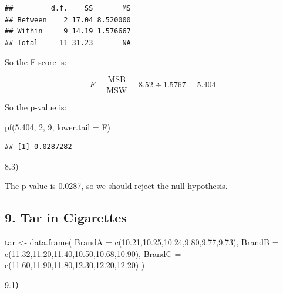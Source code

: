 \documentclass[
]{article}
\newenvironment{Shaded}{\begin{snugshade}}{\end{snugshade}}
\newcommand{\AttributeTok}[1]{\textcolor[rgb]{0.77,0.63,0.00}{#1}}
\newcommand{\DecValTok}[1]{\textcolor[rgb]{0.00,0.00,0.81}{#1}}
\newcommand{\FloatTok}[1]{\textcolor[rgb]{0.00,0.00,0.81}{#1}}
\newcommand{\FunctionTok}[1]{\textcolor[rgb]{0.00,0.00,0.00}{#1}}
\newcommand{\NormalTok}[1]{#1}
\newcommand{\OtherTok}[1]{\textcolor[rgb]{0.56,0.35,0.01}{#1}}
\begin{document}
\begin{verbatim}
##         d.f.    SS       MS
## Between    2 17.04 8.520000
## Within     9 14.19 1.576667
## Total     11 31.23       NA
\end{verbatim}

So the F-score is:

\[
F = \frac{\text{MSB}}{\text{MSW}} = 8.52 \div 1.5767 = 5.404
\]

So the p-value is:

\begin{Shaded}
\begin{Highlighting}[]
\FunctionTok{pf}\NormalTok{(}\FloatTok{5.404}\NormalTok{, }\DecValTok{2}\NormalTok{, }\DecValTok{9}\NormalTok{, }\AttributeTok{lower.tail =}\NormalTok{ F)}
\end{Highlighting}
\end{Shaded}

\begin{verbatim}
## [1] 0.0287282
\end{verbatim}

8.3)

The p-value is 0.0287, so we should reject the null hypothesis.

\hypertarget{tar-in-cigarettes}{%
\subsection{9. Tar in Cigarettes}\label{tar-in-cigarettes}}

\begin{Shaded}
\begin{Highlighting}[]
\NormalTok{tar }\OtherTok{\textless{}{-}} \FunctionTok{data.frame}\NormalTok{(}
  \AttributeTok{BrandA =} \FunctionTok{c}\NormalTok{(}\FloatTok{10.21}\NormalTok{,}\FloatTok{10.25}\NormalTok{,}\FloatTok{10.24}\NormalTok{,}\FloatTok{9.80}\NormalTok{,}\FloatTok{9.77}\NormalTok{,}\FloatTok{9.73}\NormalTok{),}
  \AttributeTok{BrandB =} \FunctionTok{c}\NormalTok{(}\FloatTok{11.32}\NormalTok{,}\FloatTok{11.20}\NormalTok{,}\FloatTok{11.40}\NormalTok{,}\FloatTok{10.50}\NormalTok{,}\FloatTok{10.68}\NormalTok{,}\FloatTok{10.90}\NormalTok{),}
  \AttributeTok{BrandC =} \FunctionTok{c}\NormalTok{(}\FloatTok{11.60}\NormalTok{,}\FloatTok{11.90}\NormalTok{,}\FloatTok{11.80}\NormalTok{,}\FloatTok{12.30}\NormalTok{,}\FloatTok{12.20}\NormalTok{,}\FloatTok{12.20}\NormalTok{)}
\NormalTok{)}
\end{Highlighting}
\end{Shaded}

9.1）
\end{document}
